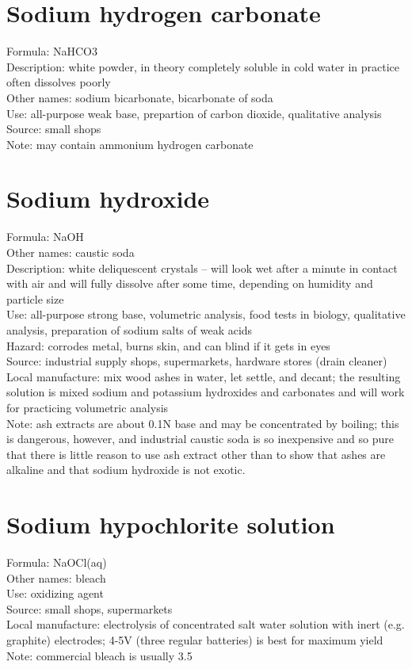 \section{Sodium hydrogen carbonate}
Formula: NaHCO3\\
Description: white powder, 
in theory completely soluble in cold water 
in practice often dissolves poorly\\
Other names: sodium bicarbonate, 
bicarbonate of soda\\
Use: all-purpose weak base, 
prepartion of carbon dioxide, 
qualitative analysis\\
Source: small shops \\
Note: may contain ammonium hydrogen carbonate

\section{Sodium hydroxide}
Formula: NaOH\\
Other names: caustic soda\\
Description: white deliquescent crystals – 
will look wet after a minute in contact with air 
and will fully dissolve after some time, 
depending on humidity and particle size\\ 
Use: all-purpose strong base, 
volumetric analysis, 
food tests in biology, 
qualitative analysis, 
preparation of sodium salts of weak acids\\
Hazard: corrodes metal, 
burns skin, 
and can blind if it gets in eyes\\
Source: industrial supply shops, 
supermarkets, 
hardware stores (drain cleaner)\\
Local manufacture: mix wood ashes in water, 
let settle, 
and decant; 
the resulting solution is mixed sodium and potassium hydroxides 
and carbonates and will work for practicing volumetric analysis\\
Note: ash extracts are about 0.1N base and may be concentrated by boiling; 
this is dangerous, 
however, 
and industrial caustic soda is so inexpensive 
and so pure that there is little reason to use ash extract 
other than to show that ashes are alkaline 
and that sodium hydroxide is not exotic.

\section{Sodium hypochlorite solution}
Formula: NaOCl(aq)\\
Other names: bleach\\
Use: oxidizing agent\\
Source: small shops, 
supermarkets\\
Local manufacture: electrolysis of concentrated salt water solution 
with inert (e.g. 
graphite) electrodes; 
4-5V (three regular batteries) is best for maximum yield\\
Note: commercial bleach is usually 3.5%

